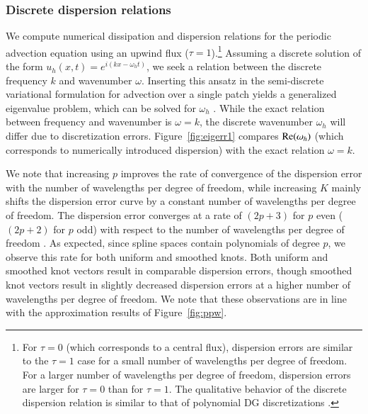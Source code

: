 \documentclass[preprint,10pt]{elsarticle}
\newcommand{\reviewerOne}[1]{#1}
\begin{document}
\subsubsection{Discrete dispersion relations }
\label{sec:disp}
We compute numerical dissipation and dispersion relations for the periodic advection equation using an upwind flux ($\tau = 1$).\footnote{\reviewerOne{For $\tau = 0$ (which corresponds to a central flux), dispersion errors are similar to the $\tau =1$ case for a small number of wavelengths per degree of freedom.  For a larger number of wavelengths per degree of freedom, dispersion errors are larger for $\tau = 0$ than for $\tau = 1$.  The qualitative behavior of the discrete dispersion relation is similar to that of polynomial DG discretizations \cite{ainsworth2004dispersive}.}}  Assuming a discrete solution of the form $u_h(x,t) = e^{i (kx - \omega_h t)}$, we seek a relation between the discrete frequency $k$ and wavenumber $\omega$.  Inserting this ansatz in the semi-discrete variational formulation for advection over a single patch yields a generalized eigenvalue problem, which can be solved for $\omega_h$ \cite{hesthaven2007nodal}.  While the exact relation between frequency and wavenumber is $\omega = k$, the discrete wavenumber $\omega_h$ will differ due to discretization errors.  Figure~\ref{fig:eigerr1} compares ${\rm Re}(\omega_h)$ (which corresponds to numerically introduced dispersion) with the exact relation $\omega = k$.  

We note that increasing $p$ improves the rate of convergence of the dispersion error with the number of wavelengths per degree of freedom, while increasing $K$ mainly shifts the dispersion error curve \reviewerOne{by a constant number of wavelengths per degree of freedom}.  The dispersion error converges at a rate of $(2p+3)$ for $p$ even ($(2p+2)$ for $p$ odd) with respect to the number of wavelengths per degree of freedom \cite{ainsworth2004dispersive}.  As expected, since spline spaces contain polynomials of degree $p$, we observe this rate for both uniform and smoothed knots.  Both uniform and smoothed knot vectors result in comparable dispersion errors, though smoothed knot vectors result in slightly decreased dispersion errors at a higher number of wavelengths per degree of freedom.  We note that these observations are in line with the approximation results of Figure~\ref{fig:ppw}.  
\end{document}
